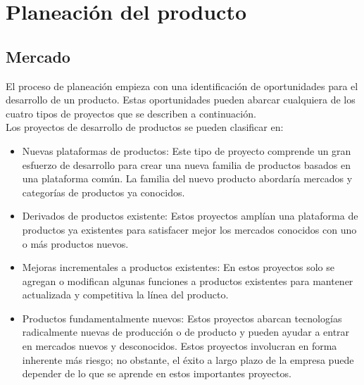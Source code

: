 
\chapter{Planeaci\'on del producto} %

\label{Chapter2} %




\section{Mercado}
El proceso de planeaci\'on empieza con una identificaci\'on de oportunidades para el desarrollo de un producto. Estas oportunidades pueden abarcar cualquiera de los cuatro tipos de proyectos que se describen a continuaci\'on.\\

Los proyectos de desarrollo de productos se pueden clasificar en:

\begin{itemize}
	\item Nuevas plataformas de productos: Este tipo de proyecto comprende un gran esfuerzo de desarrollo para crear una nueva familia de productos basados en una plataforma com\'un. La familia del nuevo producto abordar\'ia mercados y categor\'ias de productos ya conocidos.
	\item Derivados de productos existente: Estos proyectos ampl\'ian una plataforma de productos ya existentes para satisfacer mejor los mercados conocidos con uno o m\'as productos nuevos. 
	\item Mejoras incrementales a productos existentes: En estos proyectos solo se agregan o modifican algunas funciones a productos existentes para mantener actualizada y competitiva la l\'inea del producto.
	\item Productos fundamentalmente nuevos: Estos proyectos abarcan tecnolog\'ias radicalmente nuevas de producci\'on o de producto y pueden ayudar a entrar en mercados nuevos y desconocidos. Estos proyectos involucran en forma inherente m\'as riesgo; no obstante, el \'exito a largo plazo de la empresa puede depender de lo que se aprende en estos importantes proyectos.
\end{itemize}

